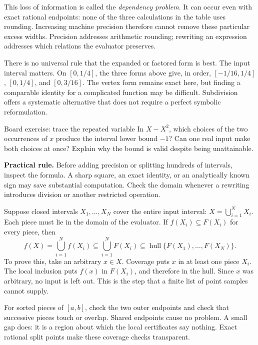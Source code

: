 This loss of information is called the \emph{dependency problem}. It can occur
even with exact rational endpoints: none of the three calculations in the
table uses rounding. Increasing machine precision therefore cannot remove
these particular excess widths. Precision addresses arithmetic rounding;
rewriting an expression addresses which relations the evaluator preserves.

There is no universal rule that the expanded or factored form is best.
The input interval matters. On $[0,1/4]$, the three forms above give, in order,
$[-1/16,1/4]$, $[0,1/4]$, and $[0,3/16]$. The vertex form remains exact here,
but finding a comparable identity for a complicated function may be difficult.
Subdivision offers a systematic alternative that does not require a perfect
symbolic reformulation.

\begin{question}{Board exercise: trace the repeated variable}
In $X-X^2$, which choices of the two occurrences of $x$ produce the interval
lower bound $-1$? Can one real input make both choices at once? Explain why
the bound is valid despite being unattainable.
\end{question}

\textbf{Practical rule.} Before adding precision or splitting hundreds of
intervals, inspect the formula. A sharp square, an exact identity, or an
analytically known sign may save substantial computation. Check the domain
whenever a rewriting introduces division or another restricted operation.

\newpage
{}

Suppose closed intervals $X_1,\ldots,X_N$ cover the entire input interval:
$X=\bigcup_{i=1}^N X_i$. Each piece must lie in the domain of the evaluator.
If $f(X_i)\subseteq F(X_i)$ for every piece, then
\[
 f(X)=\bigcup_{i=1}^N f(X_i)
       \subseteq\bigcup_{i=1}^N F(X_i)
       \subseteq\operatorname{hull}\{F(X_1),\ldots,F(X_N)\}.
\]
To prove this, take an arbitrary $x\in X$. Coverage puts $x$ in at least one
piece $X_i$. The local inclusion puts $f(x)$ in $F(X_i)$, and therefore in
the hull. Since $x$ was arbitrary, no input is left out. This is the step that
a finite list of point samples cannot supply.

For sorted pieces of $[a,b]$, check the two outer endpoints and check that
successive pieces touch or overlap. Shared endpoints cause no problem.
A small gap does: it is a region about which the local certificates say
nothing. Exact rational split points make these coverage checks transparent.

